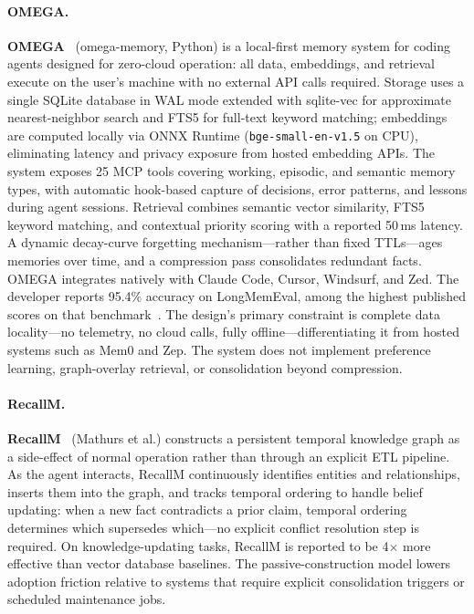 \paragraph{OMEGA.}
\textbf{OMEGA}~\cite{omega2026} (omega-memory, Python) is a local-first
memory system for coding agents designed for zero-cloud operation: all
data, embeddings, and retrieval execute on the user's machine with no
external API calls required.  Storage uses a single SQLite database in
WAL mode extended with sqlite-vec for approximate nearest-neighbor search
and FTS5 for full-text keyword matching; embeddings are computed locally
via ONNX Runtime (\texttt{bge-small-en-v1.5} on CPU), eliminating
latency and privacy exposure from hosted embedding APIs.  The system
exposes 25 MCP tools covering working, episodic, and semantic memory
types, with automatic hook-based capture of decisions, error patterns,
and lessons during agent sessions.  Retrieval combines semantic vector
similarity, FTS5 keyword matching, and contextual priority scoring
with a reported 50\,ms latency.  A dynamic decay-curve forgetting
mechanism---rather than fixed TTLs---ages memories over time, and a
compression pass consolidates redundant facts.  OMEGA integrates
natively with Claude Code, Cursor, Windsurf, and Zed.  The developer
reports 95.4\% accuracy on LongMemEval, among the highest published
scores on that benchmark~\cite{omega2026}.  The design's primary
constraint is complete data locality---no telemetry, no cloud
calls, fully offline---differentiating it from hosted systems such
as Mem0 and Zep.  The system does not implement preference learning,
graph-overlay retrieval, or consolidation beyond compression.

\paragraph{RecallM.}
\textbf{RecallM}~\cite{recallm2023} (Mathurs et al.) constructs a
persistent temporal knowledge graph as a side-effect of normal
operation rather than through an explicit ETL pipeline.  As the agent
interacts, RecallM continuously identifies entities and relationships,
inserts them into the graph, and tracks temporal ordering to handle
belief updating: when a new fact contradicts a prior claim, temporal
ordering determines which supersedes which---no explicit conflict
resolution step is required.  On knowledge-updating tasks, RecallM is
reported to be 4$\times$ more effective than vector database baselines.
The passive-construction model lowers adoption friction relative to
systems that require explicit consolidation triggers or scheduled
maintenance jobs.


